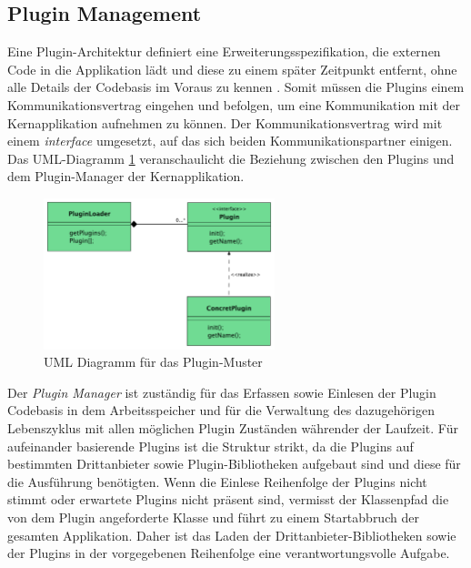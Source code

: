 	\subsection{Plugin Management} \label{sec:pm}
		Eine Plugin-Architektur definiert eine Erweiterungsspezifikation, die externen Code in die Applikation lädt und diese zu einem später Zeitpunkt entfernt, ohne alle Details der Codebasis im Voraus zu kennen \cite{Duvigneau09}. Somit müssen die Plugins einem Kommunikationsvertrag eingehen und befolgen, um eine Kommunikation mit der Kernapplikation aufnehmen zu können. Der Kommunikationsvertrag wird mit einem \textit{interface} umgesetzt, auf das sich beiden Kommunikationspartner einigen. Das UML-Diagramm \ref{fig:pluginUMLD} veranschaulicht die Beziehung zwischen den Plugins und dem Plugin-Manager der Kernapplikation. \bigbreak
		\begin{figure}[h!]
			\centering
			\includegraphics[width=0.6\textwidth]{material/images/pluginKonzept.pdf}
			\caption{UML Diagramm für das Plugin-Muster \cite{tubiblio36573}}
			\label{fig:pluginUMLD}
		\end{figure}
		Der \textit{Plugin Manager} ist zuständig für das Erfassen sowie Einlesen der Plugin Codebasis in dem Arbeitsspeicher und für die Verwaltung des dazugehörigen Lebenszyklus mit allen möglichen Plugin Zuständen währender der Laufzeit. Für aufeinander basierende Plugins ist die Struktur strikt, da die Plugins auf bestimmten Drittanbieter sowie Plugin-Bibliotheken aufgebaut sind und diese für die Ausführung benötigten. Wenn die Einlese Reihenfolge der Plugins nicht stimmt oder erwartete Plugins nicht präsent sind, vermisst der Klassenpfad die von dem Plugin angeforderte Klasse und führt zu einem Startabbruch der gesamten Applikation. Daher ist das Laden der Drittanbieter-Bibliotheken sowie der Plugins in der vorgegebenen Reihenfolge eine verantwortungsvolle Aufgabe. 

